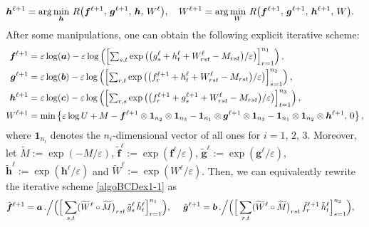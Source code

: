 \documentclass[10pt]{article}
\begin{document}
\begin{appendices}
\begin{equation*}
\begin{aligned}
\bm{h}^{\ell+1} &= \arg\min_{\bm{h}}\,R\big{(}\bm{f}^{\ell+1}, \,\bm{g}^{\ell+1}, \,\bm{h}, \,W^\ell\big{)}, \quad
W^{\ell+1} = \arg\min_{W}\,R\big{(}\bm{f}^{\ell+1}, \,\bm{g}^{\ell+1}, \,\bm{h}^{\ell+1}, \,W\big{)}.
\end{aligned}
\end{equation*}
After some manipulations, one can obtain the following explicit iterative scheme:
\begin{equation}\label{algoBCDex1-1}
\begin{aligned}
\bm{f}^{\ell+1} &= \varepsilon\log(\bm{a}) - \varepsilon\log\left(\left[{\textstyle\sum_{s,t}}\exp\big{(}\big{(}g_s^\ell + h_t^\ell + W_{rst}^\ell - M_{rst}\big{)}/\varepsilon\big{)}\right]_{r=1}^{n_1}\right), \\
\bm{g}^{\ell+1} &= \varepsilon\log(\bm{b}) - \varepsilon\log\left(\left[{\textstyle\sum_{r,t}} \exp\left(\big{(}f_r^{\ell+1} + h_t^\ell + W_{rst}^\ell - M_{rst}\big{)}/\varepsilon\right)\right]_{s=1}^{n_2}\right), \\
\bm{h}^{\ell+1} &= \varepsilon\log(\bm{c}) - \varepsilon\log\left(\left[{\textstyle\sum_{r,s}} \exp\big{(}\big{(}f_r^{\ell+1} + g_s^{\ell+1} + W_{rst}^\ell - M_{rst}\big{)}/\varepsilon\big{)}\right]_{t=1}^{n_3}\right), \\
W^{\ell+1} &= \min\left\{\varepsilon\log U + M-\bm{f}^{\ell+1}\otimes\bm{1}_{n_2}\otimes\bm{1}_{n_3}
-\bm{1}_{n_1}\otimes\bm{g}^{\ell+1}\otimes\bm{1}_{n_3} - \bm{1}_{n_1}\otimes\bm{1}_{n_2}\otimes\bm{h}^{\ell+1}, \,0\right\},
\end{aligned}
\end{equation}
where $\bm{1}_{n_i}$ denotes the $n_i$-dimensional vector of all ones for $i=1, \,2, \,3$. Moreover, let $\widetilde{M}:=\exp(-{M/\varepsilon})$, $\tilde{\bm{f}}^\ell:=\exp({\bm{f}^\ell/\varepsilon})$, $\tilde{\bm{g}}^\ell:=\exp({\bm{g}^\ell/\varepsilon})$, $\tilde{\bm{h}}^\ell:=\exp({\bm{h}^\ell/\varepsilon})$ and
$\widetilde{W}^\ell:=\exp({W^\ell/\varepsilon})$. Then, we can equivalently rewrite the iterative scheme \eqref{algoBCDex1-1} as
\begin{equation}\label{algoBCDex2-1}
\begin{aligned}
\tilde{\bm{f}}^{\ell+1} &= \bm{a}\,.\Big{/}\Big(
\Big[\sum_{s,t} (\widetilde{W}^\ell\circ\widetilde{M}\big)_{rst} \,\tilde{g}_s^\ell \,\tilde{h}_t^\ell\Big]_{r=1}^{n_1} \Big), \quad\,\,
\tilde{\bm{g}}^{\ell+1} = \bm{b}\,.\Big{/}\Big(
\Big[\sum_{r,t} (\widetilde{W}^\ell\circ\widetilde{M}\big)_{rst} \,\tilde{f}_r^{\ell+1} \,\tilde{h}_t^\ell\Big]_{s=1}^{n_2}\Big),

\end{aligned}
\end{equation}
\end{appendices}
\end{document}
